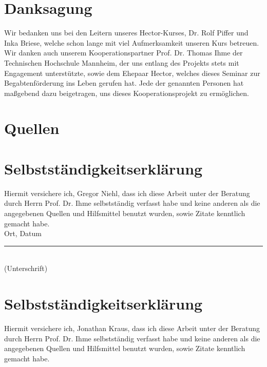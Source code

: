 \section*{Danksagung}

Wir bedanken uns bei den Leitern unseres Hector-Kurses, Dr. Rolf Piffer und Inka Briese, welche schon lange mit viel Aufmerksamkeit unseren Kurs betreuen. Wir danken auch unserem Kooperationspartner Prof. Dr. Thomas Ihme der Technischen Hochschule Mannheim, der uns entlang des Projekts stets mit Engagement unterstützte, sowie dem Ehepaar Hector, welches dieses Seminar zur Begabtenförderung ins Leben gerufen hat. Jede der genannten Personen hat maßgebend dazu beigetragen, uns dieses Kooperationsprojekt zu ermöglichen.



\section*{Quellen}
\bib
\appendix

\newpage
\section*{Selbstständigkeitserklärung}
Hiermit versichere ich, Gregor Niehl, dass ich diese Arbeit unter der Beratung durch Herrn Prof. Dr. Ihme selbstständig verfasst habe und keine anderen als die angegebenen Quellen und Hilfsmittel benutzt wurden, sowie Zitate kenntlich gemacht habe. \\[2cm]

Ort, Datum \hfill \rule{5cm}{0.4pt} \\
\hfill (Unterschrift)

\newpage
\section*{Selbstständigkeitserklärung}
Hiermit versichere ich, Jonathan Kraus, dass ich diese Arbeit unter der Beratung durch Herrn Prof. Dr. Ihme selbstständig verfasst habe und keine anderen als die angegebenen Quellen und Hilfsmittel benutzt wurden, sowie Zitate kenntlich gemacht habe. \\[2cm]

